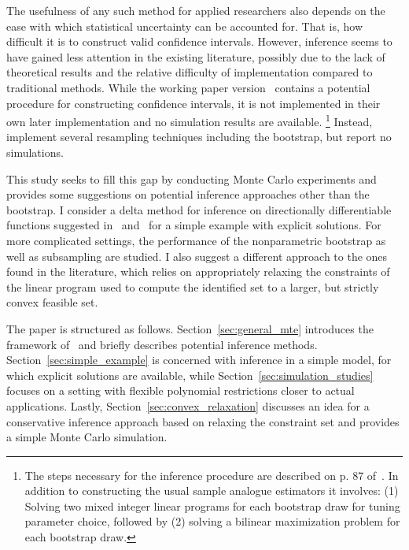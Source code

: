 \documentclass[12pt,a4paper,english]{article} %
\numberwithin{equation}{section}
\theoremstyle{definition}
\theoremstyle{remark}
\theoremstyle{plain}
\begin{document}
The usefulness of any such method for applied researchers also depends on the ease with which statistical uncertainty can be accounted for.
That is, how difficult it is to construct valid confidence intervals.
However, inference seems to have gained less attention in the existing literature, possibly due to the lack of theoretical results and the relative difficulty of implementation compared to traditional methods.
While the working paper version~\cite{mogstad2017using_nber} contains a potential procedure for constructing confidence intervals, it is not implemented in their own later implementation \citep{shea2023ivmte} and no simulation results are available.
\footnote{The steps necessary for the inference procedure are described on p. 87 of~\cite{mogstad2017using_nber}.
In addition to constructing the usual sample analogue estimators it involves: (1) Solving two mixed integer linear programs for each bootstrap draw for tuning parameter choice, followed by (2) solving a bilinear maximization problem for each bootstrap draw.}
Instead,~\cite{shea2023ivmte} implement several resampling techniques including the bootstrap, but report no simulations.

This study seeks to fill this gap by conducting Monte Carlo experiments and provides some suggestions on potential inference approaches other than the bootstrap.
I consider a delta method for inference on directionally differentiable functions suggested in~\cite{fang2019infdirdiff} and~\cite{hong2018numerical} for a simple example with explicit solutions.
For more complicated settings, the performance of the nonparametric bootstrap as well as subsampling are studied.
I also suggest a different approach to the ones found in the literature, which relies on appropriately relaxing the constraints of the linear program used to compute the identified set to a larger, but strictly convex feasible set.

The paper is structured as follows. Section~\ref{sec:general_mte} introduces the framework of~\cite{mogstad2018using} and briefly describes potential inference methods.
Section~\ref{sec:simple_example} is concerned with inference in a simple model, for which explicit solutions are available, while Section~\ref{sec:simulation_studies} focuses on a setting with flexible polynomial restrictions closer to actual applications.
Lastly, Section~\ref{sec:convex_relaxation} discusses an idea for a conservative inference approach based on relaxing the constraint set and provides a simple Monte Carlo simulation.
\end{document}
